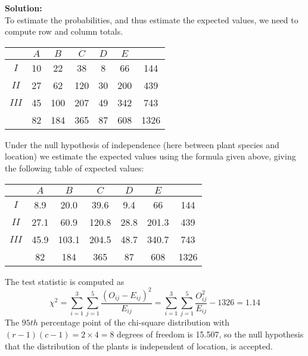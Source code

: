 \documentclass[12pt]{article}
\theoremstyle{break}
\begin{document}
\begin{mdframed}
{\bf Solution:}\\
To estimate the probabilities, and thus estimate the expected values, we need to compute row and column totals.
\begin{center}
\begin{tabular}{|c|c|c|c|c|c|c|}
               \hline
                & $A$ & $B$ & $C$ & $D$ & $E$ & \\ \hline
               $I$ & 10 & 22 & 38 & 8 & 66 & 144\\
               $II$ & 27 & 62 & 120 & 30 & 200 & 439 \\
               $III$ & 45 & 100 & 207 & 49 & 342 &743\\ \hline
                & 82 & 184& 365 & 87 & 608 &1326\\
               \hline
\end{tabular}
\end{center}
Under the null hypothesis of independence (here between plant species and location) we estimate the expected values using the formula given above, giving the following table of expected values:
\begin{center}
\begin{tabular}{|c|c|c|c|c|c|c|}
               \hline
                & $A$ & $B$ & $C$ & $D$ & $E$ & \\ \hline
               $I$ & 8.9 & 20.0 & 39.6 & 9.4 & 66 & 144\\
               $II$ & 27.1 & 60.9 & 120.8 & 28.8 & 201.3 & 439 \\
               $III$ & 45.9 & 103.1 & 204.5 & 48.7 & 340.7 &743\\ \hline
                & 82 & 184& 365 & 87 & 608 &1326\\
               \hline
\end{tabular}
\end{center}

The test statistic is computed as
$$
\chi^{2}=\sum_{i=1}^{3}\sum_{j=1}^{5}\frac{(O_{ij}-E_{ij})^{2}}{E_{ij}}=\sum_{i=1}^{3}\sum_{j=1}^{5}\frac{O_{ij}^{2}}{E_{ij}}-1326=1.14
$$
The $95th$ percentage point of the chi-square distribution with $(r-1)(c-1)=2 \times 4 = 8$ degrees of freedom is 15.507, so the null hypothesis that the distribution of the plants is independent of location, is accepted.
\end{mdframed}
\end{document}
